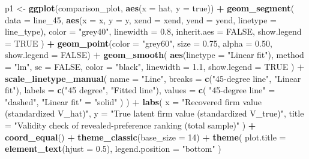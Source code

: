 \documentclass[
]{article}
\newenvironment{Shaded}{\begin{snugshade}}{\end{snugshade}}
\newcommand{\AttributeTok}[1]{\textcolor[rgb]{0.13,0.29,0.53}{#1}}
\newcommand{\ConstantTok}[1]{\textcolor[rgb]{0.56,0.35,0.01}{#1}}
\newcommand{\DecValTok}[1]{\textcolor[rgb]{0.00,0.00,0.81}{#1}}
\newcommand{\FloatTok}[1]{\textcolor[rgb]{0.00,0.00,0.81}{#1}}
\newcommand{\FunctionTok}[1]{\textcolor[rgb]{0.13,0.29,0.53}{\textbf{#1}}}
\newcommand{\NormalTok}[1]{#1}
\newcommand{\OtherTok}[1]{\textcolor[rgb]{0.56,0.35,0.01}{#1}}
\newcommand{\SpecialCharTok}[1]{\textcolor[rgb]{0.81,0.36,0.00}{\textbf{#1}}}
\newcommand{\StringTok}[1]{\textcolor[rgb]{0.31,0.60,0.02}{#1}}
\begin{document}
\begin{Shaded}
\begin{Highlighting}[]
\NormalTok{p1 }\OtherTok{\textless{}{-}} \FunctionTok{ggplot}\NormalTok{(comparison\_plot, }\FunctionTok{aes}\NormalTok{(}\AttributeTok{x =}\NormalTok{ hat, }\AttributeTok{y =}\NormalTok{ true)) }\SpecialCharTok{+}
    \FunctionTok{geom\_segment}\NormalTok{(}
        \AttributeTok{data =}\NormalTok{ line\_45,}
        \FunctionTok{aes}\NormalTok{(}\AttributeTok{x =}\NormalTok{ x, }\AttributeTok{y =}\NormalTok{ y, }\AttributeTok{xend =}\NormalTok{ xend, }\AttributeTok{yend =}\NormalTok{ yend, }\AttributeTok{linetype =}\NormalTok{ line\_type),}
        \AttributeTok{color =} \StringTok{"grey40"}\NormalTok{,}
        \AttributeTok{linewidth =} \FloatTok{0.8}\NormalTok{,}
        \AttributeTok{inherit.aes =} \ConstantTok{FALSE}\NormalTok{,}
        \AttributeTok{show.legend =} \ConstantTok{TRUE}
\NormalTok{    ) }\SpecialCharTok{+}
    \FunctionTok{geom\_point}\NormalTok{(}\AttributeTok{color =} \StringTok{"grey60"}\NormalTok{, }\AttributeTok{size =} \FloatTok{0.75}\NormalTok{, }\AttributeTok{alpha =} \FloatTok{0.50}\NormalTok{, }\AttributeTok{show.legend =} \ConstantTok{FALSE}\NormalTok{) }\SpecialCharTok{+}
    \FunctionTok{geom\_smooth}\NormalTok{(}
        \FunctionTok{aes}\NormalTok{(}\AttributeTok{linetype =} \StringTok{"Linear fit"}\NormalTok{),}
        \AttributeTok{method =} \StringTok{"lm"}\NormalTok{,}
        \AttributeTok{se =} \ConstantTok{FALSE}\NormalTok{,}
        \AttributeTok{color =} \StringTok{"black"}\NormalTok{,}
        \AttributeTok{linewidth =} \FloatTok{1.1}\NormalTok{,}
        \AttributeTok{show.legend =} \ConstantTok{TRUE}
\NormalTok{    ) }\SpecialCharTok{+}
    \FunctionTok{scale\_linetype\_manual}\NormalTok{(}
        \AttributeTok{name =} \StringTok{"Line"}\NormalTok{,}
        \AttributeTok{breaks =} \FunctionTok{c}\NormalTok{(}\StringTok{"45{-}degree line"}\NormalTok{, }\StringTok{"Linear fit"}\NormalTok{),}
        \AttributeTok{labels =} \FunctionTok{c}\NormalTok{(}\StringTok{"45 degree"}\NormalTok{, }\StringTok{"Fitted line"}\NormalTok{),}
        \AttributeTok{values =} \FunctionTok{c}\NormalTok{(}
            \StringTok{"45{-}degree line"} \OtherTok{=} \StringTok{"dashed"}\NormalTok{,}
            \StringTok{"Linear fit"} \OtherTok{=} \StringTok{"solid"}
\NormalTok{        )}
\NormalTok{    ) }\SpecialCharTok{+}
    \FunctionTok{labs}\NormalTok{(}
        \AttributeTok{x =} \StringTok{"Recovered firm value (standardized V\_hat)"}\NormalTok{,}
        \AttributeTok{y =} \StringTok{"True latent firm value (standardized V\_true)"}\NormalTok{,}
        \AttributeTok{title =} \StringTok{"Validity check of revealed{-}preference ranking (total sample)"}
\NormalTok{    ) }\SpecialCharTok{+}
    \FunctionTok{coord\_equal}\NormalTok{() }\SpecialCharTok{+}
    \FunctionTok{theme\_classic}\NormalTok{(}\AttributeTok{base\_size =} \DecValTok{14}\NormalTok{) }\SpecialCharTok{+}
    \FunctionTok{theme}\NormalTok{(}
        \AttributeTok{plot.title =} \FunctionTok{element\_text}\NormalTok{(}\AttributeTok{hjust =} \FloatTok{0.5}\NormalTok{),}
        \AttributeTok{legend.position =} \StringTok{"bottom"}
\NormalTok{    )}


\end{Highlighting}
\end{Shaded}
\end{document}
